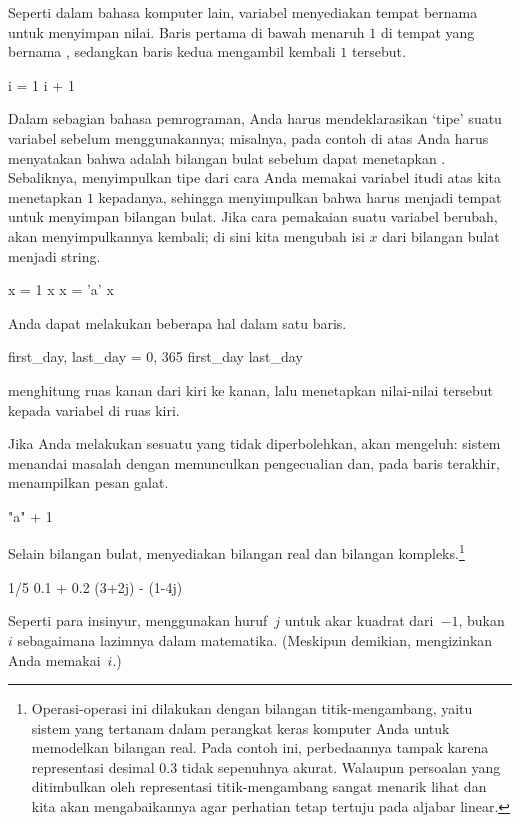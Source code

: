 Seperti dalam bahasa komputer lain, 
variabel menyediakan tempat bernama untuk menyimpan nilai.
Baris pertama di bawah menaruh $1$ di tempat yang bernama ,
sedangkan baris kedua mengambil kembali $1$ tersebut.
\begin{pythonconsole}
i = 1
i + 1
\end{pythonconsole}
Dalam sebagian bahasa pemrograman, Anda harus mendeklarasikan `tipe' suatu variabel
sebelum menggunakannya; misalnya, pada contoh di atas Anda harus menyatakan 
bahwa  adalah bilangan bulat sebelum dapat menetapkan .
Sebaliknya, \python{} menyimpulkan tipe 
dari cara Anda memakai variabel itu\Dash di atas kita menetapkan $1$ kepadanya,
sehingga \python{} menyimpulkan bahwa  harus menjadi tempat untuk menyimpan bilangan bulat.
Jika cara pemakaian suatu variabel berubah, \python{} akan 
menyimpulkannya kembali; di sini kita mengubah isi $x$ dari bilangan bulat menjadi string.
\begin{pythonconsole}
x = 1
x
x = 'a'
x
\end{pythonconsole}

Anda dapat melakukan beberapa hal dalam satu baris.
\begin{pythonconsole}
first_day, last_day = 0, 365
first_day
last_day   
\end{pythonconsole}
\python{} menghitung ruas kanan dari kiri ke kanan, lalu menetapkan 
nilai-nilai tersebut kepada variabel di ruas kiri.

Jika Anda melakukan sesuatu yang tidak diperbolehkan, 
\python{} akan mengeluh: sistem menandai masalah dengan 
memunculkan pengecualian dan, pada baris terakhir, menampilkan pesan 
galat.
\begin{pythonconsole}
"a" + 1
\end{pythonconsole}

Selain bilangan bulat, 
\python{} menyediakan bilangan real dan bilangan kompleks.\footnote{%
  Operasi-operasi ini
  dilakukan dengan bilangan titik-mengambang, yaitu sistem 
  yang tertanam dalam perangkat keras komputer Anda untuk
  memodelkan bilangan real.
  Pada contoh ini, perbedaannya tampak
  karena representasi desimal $0.3$ tidak sepenuhnya akurat.
  Walaupun persoalan yang ditimbulkan oleh representasi titik-mengambang sangat menarik\protect\Dash
  lihat \protect\cite{PythonTeam19a} dan \protect\cite{Goldberg91}\protect\Dash
  kita akan mengabaikannya agar perhatian tetap tertuju pada 
  aljabar linear.}
\begin{pythonconsole}
1/5
0.1 + 0.2
(3+2j) - (1-4j)
\end{pythonconsole}
Seperti para insinyur, \python{} menggunakan huruf~$j$ untuk akar
kuadrat dari~$-1$, bukan~$i$ sebagaimana lazimnya dalam matematika.
(Meskipun demikian, \protect\Sage{} mengizinkan Anda memakai~$i$.)

